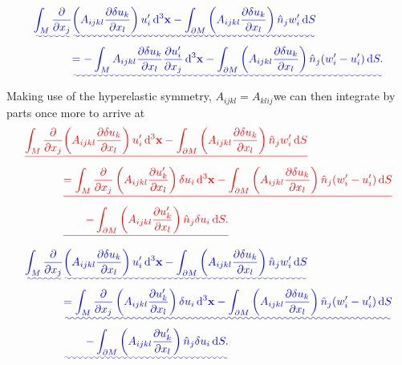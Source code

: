 \documentclass[a4paper,12pt]{paper}
\providecommand{\DIFadd}[1]{{\protect\color{blue}\uwave{#1}}} %
\providecommand{\DIFdel}[1]{{\protect\color{red}\sout{#1}}}                      %
\providecommand{\DIFaddbegin}{} %
\providecommand{\DIFaddend}{} %
\providecommand{\DIFdelbegin}{} %
\providecommand{\DIFdelend}{} %
\begin{document}
\DIFdelend \DIFaddbegin \begin{align}
\DIFadd{\int_{M}\frac{\partial}{\partial x_{j}}}&\DIFadd{\left(A_{ijkl}\frac{\partial\delta u_{k}}{\partial x_{l}}\right)u_{i}'\dd^{3}\mathbf{x} - \int_{\partial M}\left(A_{ijkl}\frac{\partial\delta u_{k}}{\partial x_{l}}\right)\hat{n}_{j}w_{i}'\dd S \nonumber }\\
&\DIFadd{= -\int_{M}A_{ijkl}\frac{\partial\delta u_{k}}{\partial x_{l}}\frac{\partial u_{i}'}{\partial x_{j}}\dd^{3}\mathbf{x} - \int_{\partial M}\left(A_{ijkl}\frac{\partial\delta u_{k}}{\partial x_{l}}\right)\hat{n}_{j}(w_{i}'-u_{i}')\dd S.
\label{eq:23}
}\end{align}\DIFaddend 
Making use of the hyperelastic symmetry, $A_{ijkl}=A_{klij}$\DIFaddbegin \DIFadd{, }\DIFaddend we can then integrate by parts once more to arrive at
\DIFdelbegin \begin{align*}
\DIFdel{\int_{M}\frac{\partial}{\partial x_{j}}}&\DIFdel{\left(A_{ijkl}\frac{\partial\delta u_{k}}{\partial x_{l}}\right)u_{i}'\dd^{3}\mathbf{x} - \int_{\partial M}\left(A_{ijkl}\frac{\partial\delta u_{k}}{\partial x_{l}}\right)\hat{n}_{j}w_{i}'\dd S \nonumber }\\
&\DIFdel{= \int_{M}\frac{\partial}{\partial x_{j}}\left(A_{ijkl}\frac{\partial u_{k}'}{\partial x_{l}}\right)\delta u_{i}\dd^{3}\mathbf{x} - \int_{\partial M}\left(A_{ijkl}\frac{\partial\delta u_{k}}{\partial x_{l}}\right)\hat{n}_{j}(w_{i}'-u_{i}')\dd S \nonumber }\\
& \DIFdel{\qquad -\int_{\partial M}\left(A_{ijkl}\frac{\partial u_{k}'}{\partial x_{l}}\right)\hat{n}_{j}\delta u_{i}\dd S.
}\end{align*}%
\DIFdelend \DIFaddbegin \begin{align}
\DIFadd{\int_{M}\frac{\partial}{\partial x_{j}}}&\DIFadd{\left(A_{ijkl}\frac{\partial\delta u_{k}}{\partial x_{l}}\right)u_{i}'\dd^{3}\mathbf{x} - \int_{\partial M}\left(A_{ijkl}\frac{\partial\delta u_{k}}{\partial x_{l}}\right)\hat{n}_{j}w_{i}'\dd S \nonumber }\\
&\DIFadd{= \int_{M}\frac{\partial}{\partial x_{j}}\left(A_{ijkl}\frac{\partial u_{k}'}{\partial x_{l}}\right)\delta u_{i}\dd^{3}\mathbf{x} - \int_{\partial M}\left(A_{ijkl}\frac{\partial\delta u_{k}}{\partial x_{l}}\right)\hat{n}_{j}(w_{i}'-u_{i}')\dd S \nonumber }\\
& \DIFadd{\qquad -\int_{\partial M}\left(A_{ijkl}\frac{\partial u_{k}'}{\partial x_{l}}\right)\hat{n}_{j}\delta u_{i}\dd S.
\label{eq:24}
}\end{align}\DIFaddend 
\end{document}

